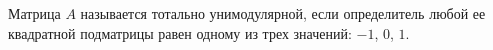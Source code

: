Матрица $A$ называется тотально унимодулярной, если определитель любой ее квадратной подматрицы равен
одному из трех значений: $-1$, $0$, $1$.
